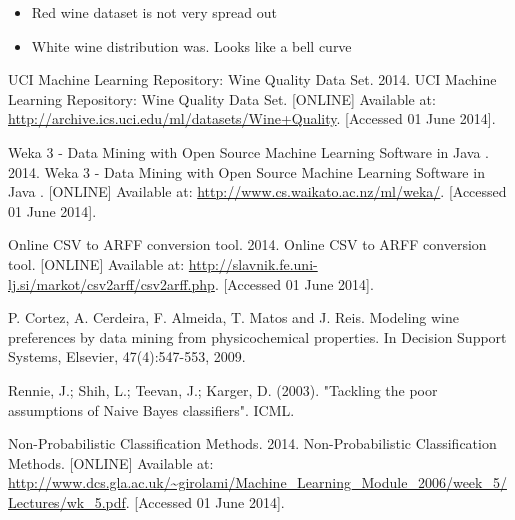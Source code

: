 \documentclass[a4paper,12pt,openany]{report}
\begin{document}
\begin{itemize}
	\item Red wine dataset is not very spread out
	\item White wine distribution was. Looks like a bell curve

\end{itemize}

\begin{thebibliography}{10}
	UCI Machine Learning Repository: Wine Quality Data Set. 2014. UCI Machine Learning Repository: Wine Quality Data Set. [ONLINE] Available at: \url{http://archive.ics.uci.edu/ml/datasets/Wine+Quality}. [Accessed 01 June 2014].

	Weka 3 - Data Mining with Open Source Machine Learning Software in Java . 2014. Weka 3 - Data Mining with Open Source Machine Learning Software in Java . [ONLINE] Available at: \url{http://www.cs.waikato.ac.nz/ml/weka/}. [Accessed 01 June 2014].

	Online CSV to ARFF conversion tool. 2014. Online CSV to ARFF conversion tool. [ONLINE] Available at: \url{http://slavnik.fe.uni-lj.si/markot/csv2arff/csv2arff.php}. [Accessed 01 June 2014].

	P. Cortez, A. Cerdeira, F. Almeida, T. Matos and J. Reis. Modeling wine preferences by data mining from physicochemical properties. In Decision Support Systems, Elsevier, 47(4):547-553, 2009.

	Rennie, J.; Shih, L.; Teevan, J.; Karger, D. (2003). "Tackling the poor assumptions of Naive Bayes classifiers". ICML.

Non-Probabilistic Classiﬁcation Methods. 2014. Non-Probabilistic Classiﬁcation Methods. [ONLINE] Available at: \url{http://www.dcs.gla.ac.uk/~girolami/Machine_Learning_Module_2006/week_5/Lectures/wk_5.pdf}. [Accessed 01 June 2014].

\end{thebibliography}
\end{document}
